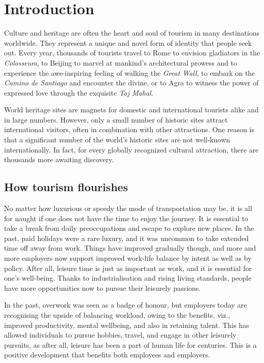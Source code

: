 \chapter{Introduction} %
\label{cha:intro}

Culture and heritage are often the heart and soul of tourism in many destinations worldwide. They represent a unique and novel form of identity that people seek out. Every year, thousands of tourists travel to Rome to envision gladiators in the \emph{Colosseum}, to Beijing to marvel at mankind's architectural prowess and to experience the awe-inspiring feeling of walking the \emph{Great Wall}, to embark on the \emph{Camino de Santiago} and encounter the divine, or to Agra to witness the power of expressed love through the exquisite \emph{Taj Mahal}.

World heritage sites are magnets for domestic and international tourists alike and in large numbers. However, only a small number of historic sites attract international visitors, often in combination with other attractions. One reason is that a significant number of the world's historic sites are not well-known internationally. In fact, for every globally recognized cultural attraction, there are thousands more awaiting discovery.

\section{How tourism flourishes} %
\label{sec:htf}

No matter how luxurious or speedy the mode of transportation may be, it is all for naught if one does not have the time to enjoy the journey. It is essential to take a break from daily preoccupations and escape to explore new places. In the past, paid holidays were a rare luxury, and it was uncommon to take extended time off away from work. Things have improved gradually though, and more and more employers now support improved work-life balance by intent as well as by policy. After all, leisure time is just as important as work, and it is essential for one's well-being. Thanks to industrialisation and rising living standards, people have more opportunities now to pursue their leisurely passions.

In the past, overwork was seen as a badge of honour, but employers today are recognising the upside of balancing workload, owing to the benefits, viz., improved productivity, mental wellbeing, and also in retaining talent. This has allowed individuals to pursue hobbies, travel, and engage in other leisurely pursuits, as after all, leisure has been a part of human life for centuries. This is a positive development that benefits both employees and employers.

